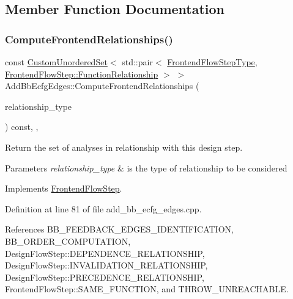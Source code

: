 \subsection{Member Function Documentation}
\mbox{\label{classAddBbEcfgEdges_a25f0dc82c0ee76dbb23ee6562d87b81d}} 
\subsubsection{\texorpdfstring{Compute\+Frontend\+Relationships()}{ComputeFrontendRelationships()}}
{\footnotesize\ttfamily const \hyperlink{classCustomUnorderedSet}{Custom\+Unordered\+Set}$<$ std\+::pair$<$ \hyperlink{frontend__flow__step_8hpp_afeb3716c693d2b2e4ed3e6d04c3b63bb}{Frontend\+Flow\+Step\+Type}, \hyperlink{classFrontendFlowStep_af7cf30f2023e5b99e637dc2058289ab0}{Frontend\+Flow\+Step\+::\+Function\+Relationship} $>$ $>$ Add\+Bb\+Ecfg\+Edges\+::\+Compute\+Frontend\+Relationships (\begin{DoxyParamCaption}\item[{const \hyperlink{classDesignFlowStep_a723a3baf19ff2ceb77bc13e099d0b1b7}{Design\+Flow\+Step\+::\+Relationship\+Type}}]{relationship\+\_\+type }\end{DoxyParamCaption}) const\hspace{0.3cm}{\ttfamily [override]}, {\ttfamily [private]}, {\ttfamily [virtual]}}



Return the set of analyses in relationship with this design step. 


\begin{DoxyParams}{Parameters}
{\em relationship\+\_\+type} & is the type of relationship to be considered \\
\hline
\end{DoxyParams}


Implements \hyperlink{classFrontendFlowStep_abeaff70b59734e462d347ed343dd700d}{Frontend\+Flow\+Step}.



Definition at line 81 of file add\+\_\+bb\+\_\+ecfg\+\_\+edges.\+cpp.



References B\+B\+\_\+\+F\+E\+E\+D\+B\+A\+C\+K\+\_\+\+E\+D\+G\+E\+S\+\_\+\+I\+D\+E\+N\+T\+I\+F\+I\+C\+A\+T\+I\+ON, B\+B\+\_\+\+O\+R\+D\+E\+R\+\_\+\+C\+O\+M\+P\+U\+T\+A\+T\+I\+ON, Design\+Flow\+Step\+::\+D\+E\+P\+E\+N\+D\+E\+N\+C\+E\+\_\+\+R\+E\+L\+A\+T\+I\+O\+N\+S\+H\+IP, Design\+Flow\+Step\+::\+I\+N\+V\+A\+L\+I\+D\+A\+T\+I\+O\+N\+\_\+\+R\+E\+L\+A\+T\+I\+O\+N\+S\+H\+IP, Design\+Flow\+Step\+::\+P\+R\+E\+C\+E\+D\+E\+N\+C\+E\+\_\+\+R\+E\+L\+A\+T\+I\+O\+N\+S\+H\+IP, Frontend\+Flow\+Step\+::\+S\+A\+M\+E\+\_\+\+F\+U\+N\+C\+T\+I\+ON, and T\+H\+R\+O\+W\+\_\+\+U\+N\+R\+E\+A\+C\+H\+A\+B\+LE.

